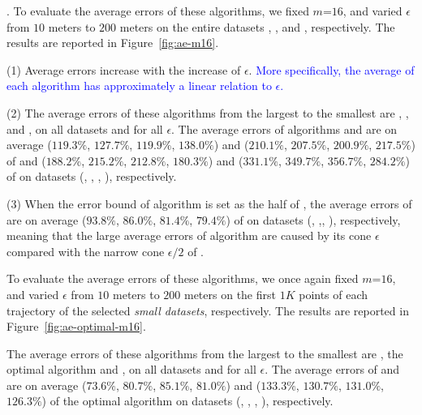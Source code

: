 {%
.
To evaluate the average errors of these algorithms, we fixed {$m$=$16$}, and
varied $\epsilon$ from $10$ meters to $200$ meters on the entire
{datasets} \sercar, \geolife, \mopsi and \pricar, respectively.
The results are reported in Figure~\ref{fig:ae-m16}.

\ni(1) Average errors increase with the increase of $\epsilon$. 
\textcolor{blue}{More specifically, the average of each algorithm has approximately a linear relation to $\epsilon$.}

\ni(2) The average errors of these algorithms from the largest to the smallest are \cista, \cist, \dps and \squishe, on all datasets and for all $\epsilon$.
The average errors of algorithms \cist and \cista are on average
($119.3\%$, $127.7\%$, $119.9\%$, $138.0\%$)
and ($210.1\%$, $207.5\%$, $200.9\%$, $217.5\%$)
of \dps and ($188.2\%$, $215.2\%$, $212.8\%$, $180.3\%$) and
($331.1\%$, $349.7\%$, $356.7\%$, $284.2\%$)
 of \squishe on datasets (\sercar, \geolife, \mopsi, \pricar), respectively.

\ni(3) When the error bound of algorithm \cista is set as the half of \cist, the
average errors of \cista are on average ($93.8\%$, $86.0\%$, $81.4\%$, {$79.4\%$}) of \cist on {datasets} (\sercar, \geolife,\mopsi, \pricar), respectively, meaning that the large average errors of algorithm \cista are caused by its cone \wrt $\epsilon$ compared with the narrow cone \wrt $\epsilon/2$ of \cist.

To evaluate the average errors of these algorithms, we once again fixed {$m$=$16$}, and
varied $\epsilon$ from $10$ meters to $200$ meters on the first $1K$ points of each trajectory of the selected \textit{small datasets}, respectively.
The results are reported in Figure~\ref{fig:ae-optimal-m16}.

The average errors of these algorithms from the largest to the smallest are \cista, the optimal algorithm and \cist, on all datasets and for all $\epsilon$.
The average errors of \cist and \cista are on average
($73.6\%$, $80.7\%$, $85.1\%$, $81.0\%$)
and ($133.3\%$, $130.7\%$, $131.0\%$, $126.3\%$)
of the optimal algorithm on datasets (\sercar, \geolife, \mopsi, \pricar), respectively.

}
